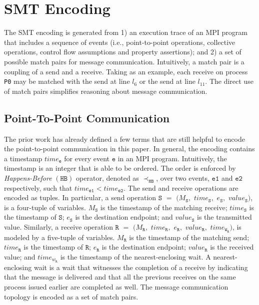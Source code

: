 \section{SMT Encoding}
The SMT encoding is generated from 1) an execution trace of an MPI program that includes a sequence of events (i.e., point-to-point operations, collective operations, control flow assumptions and property assertions); and 2) a set of possible match pairs for message communication. Intuitively, a match pair is a coupling of a send and a receive. Taking  as an example, each receive on process \texttt{P0} may be matched with the send at line $l_6$ or the send at line $l_{11}$. The direct use of match pairs simplifies reasoning about message communication. 

\subsection{Point-To-Point Communication}

The prior work has already defined a few terms that are still helpful to encode the point-to-point communication in this paper. In general, the encoding contains a timestamp $\mathit{time}_\mathtt{e}$ for every event $\mathtt{e}$ in an MPI program. Intuitively, the timestamp is an integer that is able to be ordered.  The order is enforced by \emph{Happens-Before} $(\mathtt{HB})$ operator, denoted as
$\mathrm{\prec_\mathtt{HB}}$, over two events, $\mathtt{e1}$ and $\mathtt{e2}$ respectively, such that $\mathit{time}_\mathtt{e1} <  \mathit{time}_\mathtt{e2}$. The send and receive operations are encoded as tuples. In particular, a send operation $\mathtt{S}$ $=$ $(M_\mathtt{S},$ $\mathit{time}_\mathtt{S},$ $e_\mathtt{S},$ $\mathit{value}_\mathtt{S})$, is a four-tuple of variables. $M_\mathtt{S}$ is the timestamp of the matching receive; $\mathit{time}_\mathtt{S}$ is the timestamp of $\mathtt{S}$; $e_\mathtt{S}$ is the destination endpoint; and $\mathit{value}_\mathtt{S}$ is the transmitted value. Similarly, a receive operation $\mathtt{R}$ $=$ $(M_\mathtt{R},$ $\mathit{time}_\mathtt{R},$ $e_\mathtt{R},$ $\mathit{value}_\mathtt{R},$ $\mathit{time}_{\mathtt{W}_\mathtt{R}})$, is modeled by a five-tuple of variables. $M_\mathtt{R}$ is the timestamp of the matching send; $\mathit{time}_\mathtt{R}$ is the timestamp of $\mathtt{R}$; $e_\mathtt{R}$ is the destination endpoint; $\mathit{value}_\mathtt{R}$ is the received value; and $\mathit{time}_{\mathit{w}_\mathtt{R}}$ is the timestamp of the nearest-enclosing wait. A nearest-enclosing wait is a wait that witnesses the completion of a receive by indicating that the message is delivered and that all the previous receives on the same process issued earlier are completed as well. The message communication topology is encoded as a set of match pairs.

